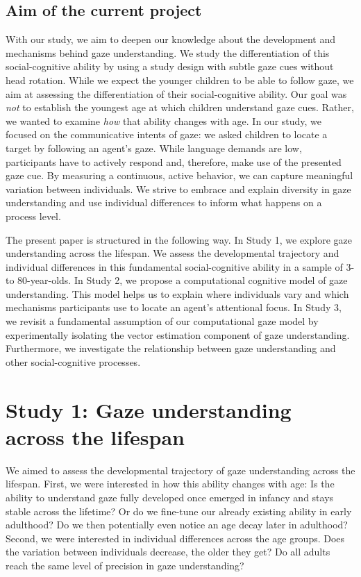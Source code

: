 \documentclass[
  man,mask,floatsintext]{apa6}
\begin{document}
\hypertarget{aim-of-the-current-project}{%
\subsection{Aim of the current project}\label{aim-of-the-current-project}}

With our study, we aim to deepen our knowledge about the development and mechanisms behind gaze understanding. We study the differentiation of this social-cognitive ability by using a study design with subtle gaze cues without head rotation. While we expect the younger children to be able to follow gaze, we aim at assessing the differentiation of their social-cognitive ability. Our goal was \emph{not} to establish the youngest age at which children understand gaze cues. Rather, we wanted to examine \emph{how} that ability changes with age. In our study, we focused on the communicative intents of gaze: we asked children to locate a target by following an agent's gaze. While language demands are low, participants have to actively respond and, therefore, make use of the presented gaze cue. By measuring a continuous, active behavior, we can capture meaningful variation between individuals. We strive to embrace and explain diversity in gaze understanding and use individual differences to inform what happens on a process level.

The present paper is structured in the following way. In Study 1, we explore gaze understanding across the lifespan. We assess the developmental trajectory and individual differences in this fundamental social-cognitive ability in a sample of 3- to 80-year-olds. In Study 2, we propose a computational cognitive model of gaze understanding. This model helps us to explain where individuals vary and which mechanisms participants use to locate an agent's attentional focus. In Study 3, we revisit a fundamental assumption of our computational gaze model by experimentally isolating the vector estimation component of gaze understanding. Furthermore, we investigate the relationship between gaze understanding and other social-cognitive processes.

\hypertarget{study-1-gaze-understanding-across-the-lifespan}{%
\section{Study 1: Gaze understanding across the lifespan}\label{study-1-gaze-understanding-across-the-lifespan}}

We aimed to assess the developmental trajectory of gaze understanding across the lifespan. First, we were interested in how this ability changes with age: Is the ability to understand gaze fully developed once emerged in infancy and stays stable across the lifetime? Or do we fine-tune our already existing ability in early adulthood? Do we then potentially even notice an age decay later in adulthood? Second, we were interested in individual differences across the age groups. Does the variation between individuals decrease, the older they get?
Do all adults reach the same level of precision in gaze understanding?
\end{document}

